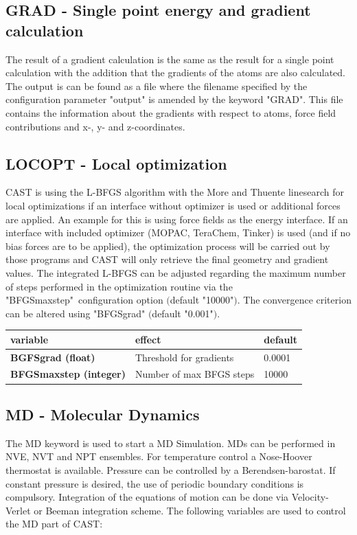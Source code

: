 \documentclass[10pt,a4paper]{article} %
\newif\ifdevmode %
\begin{document}
	\subsection{GRAD - Single point energy and gradient calculation}
	The result of a gradient calculation is the same as the result for a single point calculation with the addition that the gradients of the atoms are also calculated. The output is can be found as a file where the filename specified by the configuration parameter "output" is amended by the keyword "GRAD". This file contains the information about the gradients with respect to atoms, force field contributions and x-, y- and z-coordinates.

	\subsection{LOCOPT - Local optimization}
	\ac{CAST} is using the L-BFGS algorithm\supercite{bfgs} with the More and Thuente linesearch\supercite{morethuente} for local optimizations if an interface without optimizer is used or additional forces are applied. An example for this is using force fields as the energy interface. \ifdevmode ~\\ \colorbox{red}{what does additional forces applied mean?} ~\\ \fi
	If an interface with included optimizer (MOPAC, TeraChem, Tinker) is used (and if no bias forces are to be applied), the optimization process will be carried out by those programs and \ac{CAST} will only retrieve the final geometry and gradient values.
	The integrated L-BFGS can be adjusted regarding the maximum number of steps performed in the optimization routine via the "BFGSmaxstep"\ configuration option $($default "10000"$)$.
	The convergence criterion can be altered using "BFGSgrad" $($default "0.001"$)$.

	\begin{tabularx}{\textwidth}{l|l|l}
		variable & effect & default \\
		\hline
		\textbf{BGFSgrad (float)} & Threshold for gradients & 0.0001 \\
		\textbf{BFGSmaxstep (integer)} & Number of max BFGS steps & 10000 \\
	\end{tabularx}

	\subsection{MD - Molecular Dynamics}
	The MD keyword is used to start a \acf{MD} Simulation\supercite{md_art}. \acp{MD} can be performed in NVE, NVT and NPT ensembles. For temperature control a Nose-Hoover thermostat\supercite{nose,hoover} is available. Pressure can be controlled by a Berendsen-barostat\supercite{berendsen}. If constant pressure is desired, the use of periodic boundary conditions is compulsory. Integration of the equations of motion can be done via Velocity-Verlet or Beeman\supercite{beeman} integration scheme.
	The following variables are used to control the \ac{MD} part of \ac{CAST}:\\~\\
\end{document}
